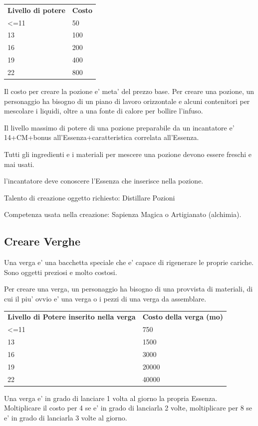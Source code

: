 \documentclass[a4paper,11pt,twoside,openany]{book}
\begin{document}
\bigskip

\begin{tabular}{ll}
\toprule
\textbf{Livello di potere} & \textbf{Costo}\tabularnewline
\textless=11 & 50\tabularnewline
13 & 100\tabularnewline
16 & 200\tabularnewline
19 & 400\tabularnewline
22 & 800\tabularnewline
\end{tabular}

\bigskip

Il costo per creare la pozione e' meta' del prezzo base. Per creare una pozione, un personaggio ha bisogno di un piano di lavoro orizzontale e alcuni contenitori per mescolare i liquidi, oltre a una fonte di calore per bollire l'infuso.

Il livello massimo di potere di una pozione preparabile da un incantatore e' 14+CM+bonus all'Essenza+caratteristica correlata all'Essenza.

Tutti gli ingredienti e i materiali per mescere una pozione devono essere freschi e mai usati.

l'incantatore deve conoscere l'Essenza che inserisce nella pozione.

Talento di creazione oggetto richiesto: Distillare Pozioni

Competenza usata nella creazione: Sapienza Magica o Artigianato (alchimia).

\subsection{Creare Verghe}

Una verga e' una bacchetta speciale che e' capace di rigenerare le proprie cariche. Sono oggetti preziosi e molto costosi.

Per creare una verga, un personaggio ha bisogno di una provvista di materiali, di cui il piu' ovvio e' una verga o i pezzi di una verga da assemblare.

\begin{tabular}{ll}
\toprule
\textbf{Livello di Potere inserito nella verga} & \textbf{Costo della verga (mo)}\tabularnewline
\textless=11 & 750\tabularnewline
13 & 1500\tabularnewline
16 & 3000\tabularnewline
19 & 20000\tabularnewline
22 & 40000\tabularnewline
\end{tabular}

\bigskip

Una verga e' in grado di lanciare 1 volta al giorno la propria Essenza. Moltiplicare il costo per 4 se e' in grado di lanciarla 2 volte, moltiplicare per 8 se e' in grado di lanciarla 3 volte al giorno. 
\end{document}
